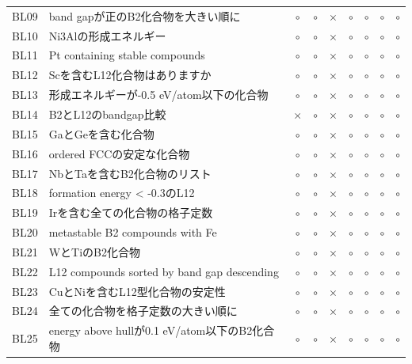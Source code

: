\documentclass[3p]{elsarticle}
\begin{document}
\begin{longtable}{lp{5cm}ccccccc}
  BL09 & band gapが正のB2化合物を大きい順に & $\circ$ & $\circ$ & $\times$ & $\circ$ & $\circ$ & $\circ$ & $\circ$ \\
  BL10 & Ni3Alの形成エネルギー & $\circ$ & $\circ$ & $\times$ & $\circ$ & $\circ$ & $\circ$ & $\circ$ \\
  BL11 & Pt containing stable compounds & $\circ$ & $\circ$ & $\times$ & $\circ$ & $\circ$ & $\circ$ & $\circ$ \\
  BL12 & Scを含むL12化合物はありますか & $\circ$ & $\circ$ & $\times$ & $\circ$ & $\circ$ & $\circ$ & $\circ$ \\
  BL13 & 形成エネルギーが-0.5 eV/atom以下の化合物 & $\circ$ & $\circ$ & $\times$ & $\circ$ & $\circ$ & $\circ$ & $\circ$ \\
  BL14 & B2とL12のbandgap比較 & $\times$ & $\circ$ & $\times$ & $\circ$ & $\circ$ & $\circ$ & $\circ$ \\
  BL15 & GaとGeを含む化合物 & $\circ$ & $\circ$ & $\times$ & $\circ$ & $\circ$ & $\circ$ & $\circ$ \\
  BL16 & ordered FCCの安定な化合物 & $\circ$ & $\circ$ & $\times$ & $\circ$ & $\circ$ & $\circ$ & $\circ$ \\
  BL17 & NbとTaを含むB2化合物のリスト & $\circ$ & $\circ$ & $\times$ & $\circ$ & $\circ$ & $\circ$ & $\circ$ \\
  BL18 & formation energy < -0.3のL12 & $\circ$ & $\circ$ & $\times$ & $\circ$ & $\circ$ & $\circ$ & $\circ$ \\
  BL19 & Irを含む全ての化合物の格子定数 & $\circ$ & $\circ$ & $\times$ & $\circ$ & $\circ$ & $\circ$ & $\circ$ \\
  BL20 & metastable B2 compounds with Fe & $\circ$ & $\circ$ & $\times$ & $\circ$ & $\circ$ & $\circ$ & $\circ$ \\
  BL21 & WとTiのB2化合物 & $\circ$ & $\circ$ & $\times$ & $\circ$ & $\circ$ & $\circ$ & $\circ$ \\
  BL22 & L12 compounds sorted by band gap descending & $\circ$ & $\circ$ & $\times$ & $\circ$ & $\circ$ & $\circ$ & $\circ$ \\
  BL23 & CuとNiを含むL12型化合物の安定性 & $\circ$ & $\circ$ & $\times$ & $\circ$ & $\circ$ & $\circ$ & $\circ$ \\
  BL24 & 全ての化合物を格子定数の大きい順に & $\circ$ & $\circ$ & $\times$ & $\circ$ & $\circ$ & $\circ$ & $\circ$ \\
  BL25 & energy above hullが0.1 eV/atom以下のB2化合物 & $\circ$ & $\circ$ & $\times$ & $\circ$ & $\circ$ & $\circ$ & $\circ$ \\

\end{longtable}
\end{document}
